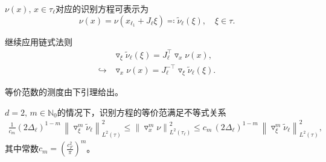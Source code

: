 $\nu(x), \, x \in \tau_{\ell}$对应的识别方程可表示为
\begin{equation*}
  \nu(x) = \nu \left( x_{\ell_{1}} + J_{\ell} \xi \right)
  \eqqcolon \widetilde{\nu}_{\ell}(\xi), \quad \xi \in \tau.
\end{equation*}

继续应用链式法则
\begin{equation*}
  \begin{split}
    & \triangledown_{\xi} \widetilde{\nu}_{\ell}(\xi) = J_{\ell}^{\top} \triangledown_{x} \nu(x), \\
    \hookrightarrow & \triangledown_{x} \nu(x) = J_{\ell}^{- \top} \triangledown_{\xi} \widetilde{\nu}_{\ell}(\xi).
\end{split}
\end{equation*}

等价范数的测度由下引理给出。
\begin{lemma}[识别方程等价范的测度($d=2$)]
  \label{lemma:finele-ref-d2-norm-equiv}
  $d=2, \, m \in \mathbb{N}_{0}$的情况下，识别方程的等价范满足不等式关系
  \begin{equation}
    \label{eq:finele-ref-d2-norm-equiv}
    \begin{split}
      \frac{1}{c_{m}} \left( 2 \Delta_{\ell} \right)^{1-m} \,
      \left\| \triangledown_{\xi}^{m}
      \widetilde{\nu}_{\ell}
      \right\|_{L^{2}(\tau)}^{2}
      \le \left\| \triangledown_{x}^{m} \nu \right\|_{L^{2}(\tau_{\ell})}^{2}
      \le c_{m} \, \left( 2 \Delta_{\ell} \right)^{1-m} \,
      \left\| \triangledown_{\xi}^{m} \widetilde{\nu}_{\ell}
      \right\|_{L^{2}(\tau)}^{2},
    \end{split}
  \end{equation}
  其中常数$c_{m} = \left( \frac{c_{F}^{2}}{\pi} \right)^{m}$。
\end{lemma}

